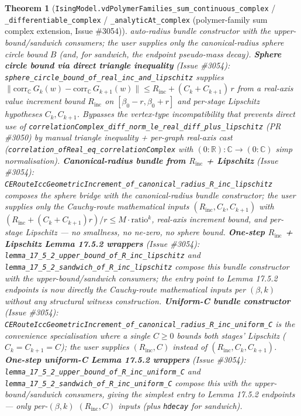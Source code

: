 \documentclass[a4paper,11pt]{article}
\newtheorem{theorem}{Theorem}
\begin{document}
\begin{theorem}[\texttt{IsingModel.vdPolymerFamilies\_sum\_continuous\_complex} /
\texttt{\_differentiable\_complex} / \texttt{\_analyticAt\_complex} (polymer-family sum
complex extension, Issue \#3054)]
auto-radius bundle constructor with the upper-bound/sandwich consumers; the
user supplies only the canonical-radius sphere circle bound \(B\) (and, for
sandwich, the endpoint pseudo-mass decay).
\textbf{Sphere circle bound via direct triangle inequality} (Issue \#3054):
\texttt{sphere\_circle\_bound\_of\_real\_inc\_and\_lipschitz} supplies
\(\|\mathrm{corr}_{\mathbb{C}}\,G_k(w)-\mathrm{corr}_{\mathbb{C}}\,G_{k+1}(w)\|
\le R_{\mathrm{inc}}+(C_k+C_{k+1})\,r\) from a real-axis value increment bound
\(R_{\mathrm{inc}}\) on \([\beta_0-r,\beta_0+r]\) and per-stage Lipschitz
hypotheses \(C_k,C_{k+1}\). Bypasses the vertex-type incompatibility that
prevents direct use of
\texttt{correlationComplex\_diff\_norm\_le\_real\_diff\_plus\_lipschitz}
(PR \#3050) by manual triangle inequality + per-graph real-axis cast
(\texttt{correlation\_ofReal\_eq\_correlationComplex} with
\((0{:}\mathbb{R}){:}\mathbb{C}\to(0{:}\mathbb{C})\) simp normalisation).
\textbf{Canonical-radius bundle from \(R_{\mathrm{inc}}\) + Lipschitz} (Issue
\#3054):
\texttt{CERouteIccGeometricIncrement\_of\_canonical\_radius\_R\_inc\_lipschitz}
composes the sphere bridge with the canonical-radius bundle constructor; the
user supplies only the Cauchy-route mathematical inputs
\((R_{\mathrm{inc}},C_k,C_{k+1})\) with
\((R_{\mathrm{inc}}+(C_k+C_{k+1})r)/r\le M\cdot\mathrm{ratio}^k\), real-axis
increment bound, and per-stage Lipschitz — no smallness, no ne-zero, no
sphere bound.
\textbf{One-step \(R_{\mathrm{inc}}\) + Lipschitz Lemma 17.5.2 wrappers} (Issue
\#3054):
\texttt{lemma\_17\_5\_2\_upper\_bound\_of\_R\_inc\_lipschitz} and
\texttt{lemma\_17\_5\_2\_sandwich\_of\_R\_inc\_lipschitz} compose this bundle
constructor with the upper-bound/sandwich consumers; the entry point to
Lemma 17.5.2 endpoints is now directly the Cauchy-route mathematical inputs
per \((\beta, k)\) without any structural witness construction.
\textbf{Uniform-C bundle constructor} (Issue \#3054):
\texttt{CERouteIccGeometricIncrement\_of\_canonical\_radius\_R\_inc\_uniform\_C}
is the convenience specialisation where a single \(C\ge0\) bounds both
stages' Lipschitz (\(C_k=C_{k+1}=C\)); the user supplies \((R_{\mathrm{inc}},C)\)
instead of \((R_{\mathrm{inc}},C_k,C_{k+1})\).
\textbf{One-step uniform-C Lemma 17.5.2 wrappers} (Issue \#3054):
\texttt{lemma\_17\_5\_2\_upper\_bound\_of\_R\_inc\_uniform\_C} and
\texttt{lemma\_17\_5\_2\_sandwich\_of\_R\_inc\_uniform\_C} compose this with
the upper-bound/sandwich consumers, giving the simplest entry to Lemma 17.5.2
endpoints — only per-\((\beta,k)\) \((R_{\mathrm{inc}},C)\) inputs (plus
\texttt{hdecay} for sandwich).

\end{theorem}
\end{document}
